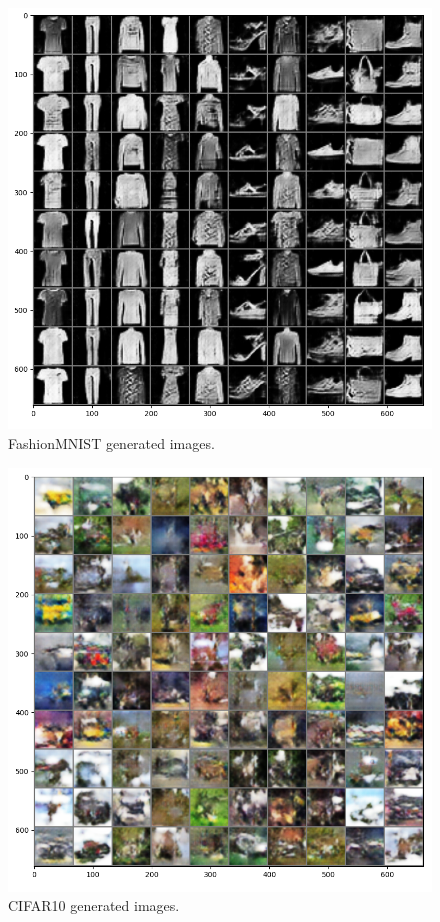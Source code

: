 \documentclass[10pt,twocolumn,letterpaper]{article}
\begin{document}
\begin{figure}
   \centering
   \includegraphics[scale=0.4]{images/fashion.png}
   \caption{FashionMNIST generated images.}
   \label{fig:fashion}
\end{figure}

\begin{figure}
   \centering
   \includegraphics[scale=0.39]{images/cifar.png}
   \caption{CIFAR10 generated images.}
   \label{fig:cifar}
\end{figure}
\end{document}
